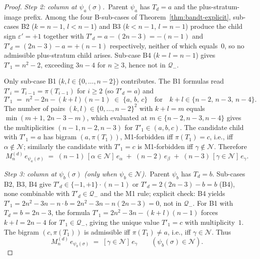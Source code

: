 \documentclass{amsart}
\theoremstyle{definition}
\theoremstyle{remark}
\begin{document}
\begin{proof}
\smallskip
\textit{Step 2: column at $\psi_a(\sigma)$.}\
Parent $\psi_a$ has $T_d = a$ and the
plus-stratum-image prefix.  Among the four B-sub-cases of
Theorem~\ref{thm:bandt-explicit}, sub-cases B2 ($k = n-1$,
$l < n-1$) and B3 ($k < n-1$, $l = n-1$) produce the child sign
$\varepsilon' = +1$ together with $T'_d = a - (2n-3) = -(n-1)$
and $T'_d = (2n-3) - a = +(n-1)$ respectively, neither of which
equals~$0$, so no admissible plus-stratum child arises.
Sub-case B4 ($k = l = n-1$) gives $T'_1 = n^2 - 2$, exceeding
$3n - 4$ for $n \ge 3$, hence not in $\mathcal{Q}_-$.

Only sub-case B1 ($k, l \in \{0, \ldots, n-2\}$) contributes.
The B1 formulas read $T'_i = T_{i-1} = \pi(T_{i-1})$ for
$i \ge 2$ (so $T'_d = a$) and
\[
  T'_1 \;=\; n^2 - 2n - (k+l)(n-1)
       \;\in\; \{a,\, b,\, c\}
       \quad\text{for}\quad k+l \in \{n-2,\, n-3,\, n-4\}.
\]
The number of pairs $(k, l) \in \{0, \ldots, n-2\}^2$ with
$k + l = m$ equals $\min(m+1,\, 2n-3-m)$, which evaluated at
$m \in \{n-2, n-3, n-4\}$ gives the multiplicities
$(n-1, n-2, n-3)$ for $T'_1 \in (a, b, c)$.  The candidate
child with $T'_1 = a$ has bigram $(a, \pi(T_1))$, M1-forbidden
iff $\pi(T_1) = c$, i.e., iff $\alpha \notin \mathcal{N}$;
similarly the candidate with $T'_1 = c$ is M1-forbidden iff
$\gamma \notin \mathcal{N}$.  Therefore
\begin{equation}\label{eq:M-col-psia}
  M_n^{(d)}\,e_{\psi_a(\sigma)}
    \;=\; (n-1)\,[\alpha \in \mathcal{N}]\,e_\alpha
       \;+\; (n-2)\,e_\beta
       \;+\; (n-3)\,[\gamma \in \mathcal{N}]\,e_\gamma.
\end{equation}

\smallskip
\textit{Step 3: column at $\psi_b(\sigma)$
\textup{(}only when $\psi_b \in \mathcal{N}$\textup{)}.}\
Parent $\psi_b$ has $T_d = b$.  Sub-cases B2, B3, B4 give
$T'_d \in \{-1, +1\} \cdot (n-1)$ or $T'_d = 2(2n-3) - b = b$ (B4),
none combinable with $T'_d \in \mathcal{Q}_-$ and the M1 rule;
explicit check: B4 yields $T'_1 = 2n^2 - 3n - n \cdot b
= 2n^2 - 3n - n(2n-3) = 0$, not in $\mathcal{Q}_-$.
For B1 with $T_d = b = 2n-3$, the formula
$T'_1 = 2n^2 - 3n - (k+l)(n-1)$ forces $k + l = 2n - 4$ for
$T'_1 \in \mathcal{Q}_-$, giving the unique value $T'_1 = c$
with multiplicity~$1$.  The bigram $(c, \pi(T_1))$ is admissible
iff $\pi(T_1) \neq a$, i.e., iff $\gamma \in \mathcal{N}$.  Thus
\begin{equation}\label{eq:M-col-psib}
  M_n^{(d)}\,e_{\psi_b(\sigma)}
    \;=\; [\gamma \in \mathcal{N}]\,e_\gamma
  \qquad (\psi_b(\sigma) \in \mathcal{N}).
\end{equation}


\end{proof}
\end{document}
